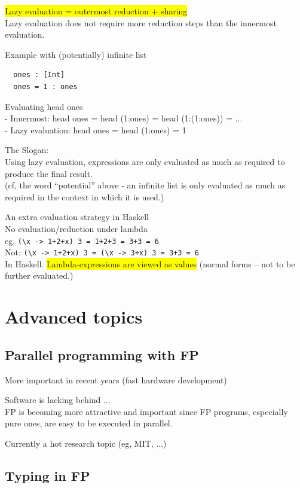\documentclass[tikz,border=10pt]{project_plan}
\begin{document}
\colorbox{yellow}{Lazy evaluation = outermost reduction + sharing}\\
Lazy evaluation does not require more reduction steps than
the innermost evaluation.

Example with (potentially) infinite list
\begin{lstlisting}
  ones : [Int]
  ones = 1 : ones
\end{lstlisting}
Evaluating head ones\\
- Innermost: head ones = head (1:ones) = head (1:(1:ones)) = ...\\
- Lazy evaluation: head ones = head (1:ones) = 1

The Slogan:\\
Using lazy evaluation, expressions are only evaluated as much as
required to produce the final result.\\
(cf, the word “potential” above - an infinite list is only evaluated as
much as required in the context in which it is used.)

An extra evaluation strategy in Haskell\\
No evaluation/reduction under lambda\\
eg, \lstinline?(\x -> 1+2+x) 3 = 1+2+3 = 3+3 = 6?\\
Not: \lstinline?(\x -> 1+2+x) 3 = (\x -> 3+x) 3 = 3+3 = 6?\\
In Haskell. \colorbox{yellow}{Lambda-expressions are viewed as values} (normal forms – not to be further evaluated.)

\section{Advanced topics}

\subsection{Parallel programming with FP}

More important in recent years (fast hardware development)

Software is lacking behind ...\\
FP is becoming more attractive and important since FP
programs, especially pure ones, are easy to be executed in
parallel.

Currently a hot research topic (eg, MIT, ...)

\subsection{Typing in FP}
\end{document}
